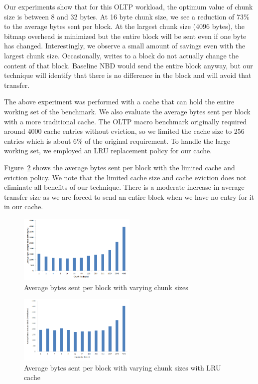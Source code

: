 \documentclass[10pt,twocolumn]{article}
\begin{document}
Our experiments show that for this OLTP workload, the optimum value of chunk
size is between 8 and 32 bytes. %
At 16 byte chunk size, we see a reduction of 73\% to the average bytes sent per
block. %
At the largest chunk size (4096 bytes), the bitmap overhead is minimized but the
entire block will be sent even if one byte has changed. %
Interestingly, we observe a small amount of savings even with the largest chunk
size. %
Occasionally, writes to a block do not actually change the content of that
block. %
Baseline NBD would send the entire block anyway, but our technique will identify
that there is no difference in the block and will avoid that transfer. %

The above experiment was performed with a cache that can hold the entire working
set of the benchmark. %
We also evaluate the average bytes sent per block with a more traditional cache. %
The OLTP macro benchmark originally required around 4000 cache entries without
eviction, so we limited the cache size to 256 entries which is about 6\% of the
original requirement. %
To handle the large working set, we employed an LRU replacement policy for our
cache. %

Figure~\ref{fig:withcacheevic} shows the average bytes sent per block
with the limited cache and eviction policy. %
We note that the limited cache size and cache eviction does not eliminate all
benefits of our technique. %
There is a moderate increase in average transfer size as we are forced to send
an entire block when we have no entry for it in our cache. %

\begin{figure}[htbp]
  \centering
  \includegraphics[width=0.50\textwidth]{figs/OLTP.png}
  \caption{Average bytes sent per block with varying chunk sizes}
  \label{fig:oltp}
\end{figure}

\begin{figure}[htbp]
  \centering
  \includegraphics[width=0.50\textwidth]{figs/WithCacheEvic.png}
  \caption{Average bytes sent per block with varying chunk sizes with LRU cache}
  \label{fig:withcacheevic}
\end{figure}
\end{document}
